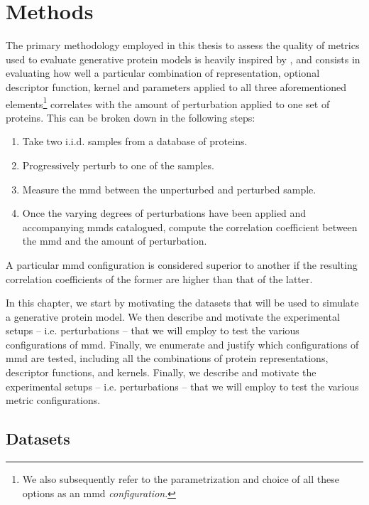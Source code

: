 \chapter{Methods}\label{chap:methods}

The primary methodology employed in this thesis to assess the quality of metrics
used to evaluate generative protein models is heavily inspired by
\cite{obray2022evaluation}, and consists in evaluating how well a particular
combination of representation, optional descriptor function, kernel and
parameters applied to all three aforementioned elements\footnote{We also
subsequently refer to the parametrization and choice of all these options as an
\gls{mmd} \emph{configuration}.} correlates with the amount of perturbation
applied to one set of proteins. This can be broken down in the following steps:

\begin{enumerate}
\item Take two i.i.d. samples from a database of proteins.
\item Progressively perturb to one of the samples.
\item Measure the \gls{mmd} between the unperturbed and perturbed sample.
\item Once the varying degrees of perturbations have been applied and
accompanying \gls{mmd}s catalogued, compute the correlation coefficient
between the \gls{mmd} and the amount of perturbation.
\end{enumerate}

A particular \gls{mmd} configuration is considered superior to another if the
resulting correlation coefficients of the former are higher than that of the latter.

In this chapter, we start by motivating the datasets that will be used to simulate a generative
protein model. We then describe and motivate the experimental setups -- i.e.
perturbations -- that we will employ to test the various configurations of \gls{mmd}.
Finally, we enumerate and justify which configurations of \gls{mmd} are tested,
including all the combinations of protein representations, descriptor functions,
and kernels. Finally, we describe and motivate the experimental setups -- i.e.
perturbations -- that we will employ to test the various metric configurations.

\section{Datasets}

